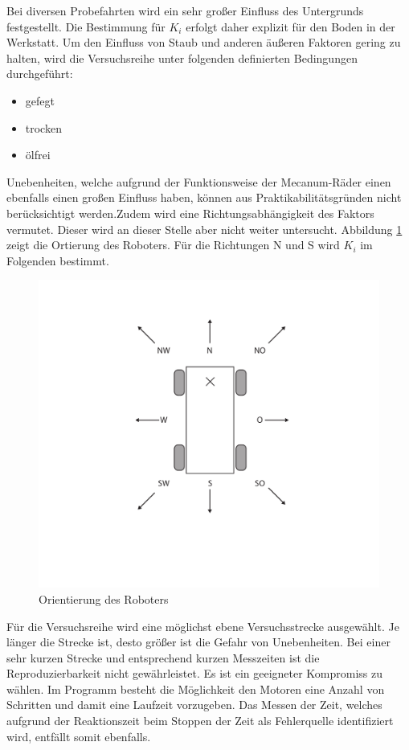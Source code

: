 Bei diversen Probefahrten wird ein sehr großer Einfluss des Untergrunds festgestellt. Die Bestimmung für  $K_i$  erfolgt daher explizit für den Boden in der Werkstatt. Um den Einfluss von Staub und anderen äußeren Faktoren gering zu halten, wird die Versuchsreihe unter folgenden definierten Bedingungen durchgeführt:

\begin{itemize}
\item gefegt
\item trocken 
\item ölfrei
\end {itemize}

Unebenheiten, welche aufgrund der Funktionsweise der Mecanum-Räder einen ebenfalls einen großen Einfluss haben, können aus Praktikabilitätsgründen nicht berücksichtigt werden.Zudem wird eine Richtungsabhängigkeit des Faktors vermutet. Dieser wird an dieser Stelle aber nicht weiter untersucht. Abbildung \ref{fig:himmel} zeigt die Ortierung des Roboters. Für die Richtungen N und S wird $K_i$ im Folgenden bestimmt. 

\begin{figure}[H]
    \centering
    \includegraphics[width=.8\textwidth]{Abbildungen/Himmelsrichtungen}
    \caption{Orientierung des Roboters}
    \label{fig:himmel}
\end{figure}

Für die Versuchsreihe wird eine möglichst ebene Versuchsstrecke ausgewählt. Je länger die Strecke ist, desto größer ist die Gefahr von Unebenheiten. Bei einer sehr kurzen Strecke und entsprechend kurzen Messzeiten ist die Reproduzierbarkeit nicht gewährleistet. Es ist ein geeigneter Kompromiss zu wählen. 
Im Programm besteht die Möglichkeit den Motoren eine Anzahl von Schritten und damit eine Laufzeit vorzugeben. Das Messen der Zeit, welches aufgrund der Reaktionszeit beim Stoppen der Zeit als Fehlerquelle identifiziert wird, entfällt somit ebenfalls. 

